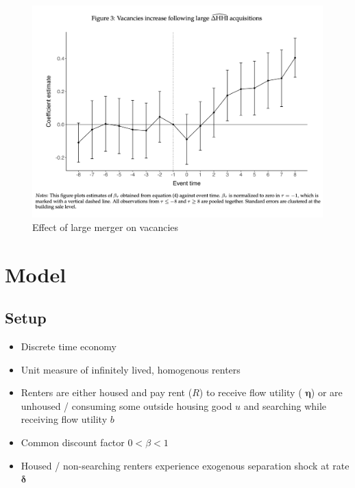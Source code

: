 \begin{figure}[htbp]
        \centering
        \includegraphics[width=0.5\linewidth]{figs/fern-jmp-vacancy.png}
        \caption{Effect of large merger on vacancies}
        \label{fig:fern-vacancies}
    \end{figure}



\section{Model}

\subsection{Setup}

\begin{itemize}
    \item Discrete time economy
    \item Unit measure of infinitely lived, homogenous renters
    \item Renters are either housed and pay rent ($R$) to receive flow utility ( $\boldsymbol{\eta}$) or are unhoused / consuming some outside housing good \textbf{$u$} and searching while receiving flow utility \textbf{$b$}
    \item Common discount factor \textbf{$0 < \beta < 1$}
    \item Housed / non-searching renters experience exogenous separation shock at rate  $\boldsymbol{\delta}$
\end{itemize}

